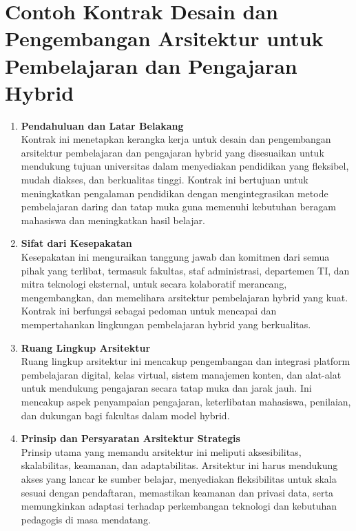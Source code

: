 \section{Contoh Kontrak Desain dan Pengembangan Arsitektur untuk Pembelajaran dan Pengajaran Hybrid}
\label{sec:contoh_kontrak_desain_dan_pengembangan_arsitektur}
\begin{enumerate}
	
	\item \textbf{Pendahuluan dan Latar Belakang} \\
	Kontrak ini menetapkan kerangka kerja untuk desain dan pengembangan arsitektur pembelajaran dan pengajaran hybrid yang disesuaikan untuk mendukung tujuan universitas dalam menyediakan pendidikan yang fleksibel, mudah diakses, dan berkualitas tinggi. Kontrak ini bertujuan untuk meningkatkan pengalaman pendidikan dengan mengintegrasikan metode pembelajaran daring dan tatap muka guna memenuhi kebutuhan beragam mahasiswa dan meningkatkan hasil belajar.
	
	\item \textbf{Sifat dari Kesepakatan} \\
	Kesepakatan ini menguraikan tanggung jawab dan komitmen dari semua pihak yang terlibat, termasuk fakultas, staf administrasi, departemen TI, dan mitra teknologi eksternal, untuk secara kolaboratif merancang, mengembangkan, dan memelihara arsitektur pembelajaran hybrid yang kuat. Kontrak ini berfungsi sebagai pedoman untuk mencapai dan mempertahankan lingkungan pembelajaran hybrid yang berkualitas.
	
	\item \textbf{Ruang Lingkup Arsitektur} \\
	Ruang lingkup arsitektur ini mencakup pengembangan dan integrasi platform pembelajaran digital, kelas virtual, sistem manajemen konten, dan alat-alat untuk mendukung pengajaran secara tatap muka dan jarak jauh. Ini mencakup aspek penyampaian pengajaran, keterlibatan mahasiswa, penilaian, dan dukungan bagi fakultas dalam model hybrid.
	
	\item \textbf{Prinsip dan Persyaratan Arsitektur Strategis} \\
	Prinsip utama yang memandu arsitektur ini meliputi aksesibilitas, skalabilitas, keamanan, dan adaptabilitas. Arsitektur ini harus mendukung akses yang lancar ke sumber belajar, menyediakan fleksibilitas untuk skala sesuai dengan pendaftaran, memastikan keamanan dan privasi data, serta memungkinkan adaptasi terhadap perkembangan teknologi dan kebutuhan pedagogis di masa mendatang.
	

\end{enumerate}
